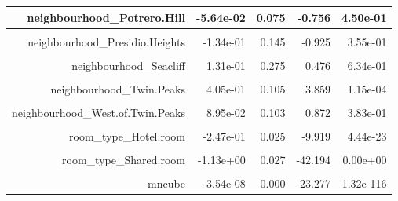 \documentclass[justified, 11pt]{scrartcl}\usepackage[]{graphicx}\usepackage[]{xcolor}
\newenvironment{knitrout}{}{} %
\begin{document}
\begin{knitrout}
\begin{table}
\begin{tabular}{r|r|r|r|r}
\hline
neighbourhood\_Potrero.Hill & -5.64e-02 & 0.075 & -0.756 & 4.50e-01\\
\hline
\cellcolor{gray!6}{neighbourhood\_Presidio} & \cellcolor{gray!6}{-1.45e-01} & \cellcolor{gray!6}{0.303} & \cellcolor{gray!6}{-0.477} & \cellcolor{gray!6}{6.33e-01}\\
\hline
neighbourhood\_Presidio.Heights & -1.34e-01 & 0.145 & -0.925 & 3.55e-01\\
\hline
\cellcolor{gray!6}{neighbourhood\_Russian.Hill} & \cellcolor{gray!6}{-2.91e-01} & \cellcolor{gray!6}{0.121} & \cellcolor{gray!6}{-2.411} & \cellcolor{gray!6}{1.59e-02}\\
\hline
neighbourhood\_Seacliff & 1.31e-01 & 0.275 & 0.476 & 6.34e-01\\
\hline
\cellcolor{gray!6}{neighbourhood\_South.of.Market} & \cellcolor{gray!6}{-2.59e-01} & \cellcolor{gray!6}{0.084} & \cellcolor{gray!6}{-3.068} & \cellcolor{gray!6}{2.16e-03}\\
\hline
neighbourhood\_Twin.Peaks & 4.05e-01 & 0.105 & 3.859 & 1.15e-04\\
\hline
\cellcolor{gray!6}{neighbourhood\_Visitacion.Valley} & \cellcolor{gray!6}{2.58e-02} & \cellcolor{gray!6}{0.087} & \cellcolor{gray!6}{0.295} & \cellcolor{gray!6}{7.68e-01}\\
\hline
neighbourhood\_West.of.Twin.Peaks & 8.95e-02 & 0.103 & 0.872 & 3.83e-01\\
\hline
\cellcolor{gray!6}{neighbourhood\_Western.Addition} & \cellcolor{gray!6}{-9.34e-02} & \cellcolor{gray!6}{0.098} & \cellcolor{gray!6}{-0.956} & \cellcolor{gray!6}{3.39e-01}\\
\hline
room\_type\_Hotel.room & -2.47e-01 & 0.025 & -9.919 & 4.44e-23\\
\hline
\cellcolor{gray!6}{room\_type\_Private.room} & \cellcolor{gray!6}{-5.86e-01} & \cellcolor{gray!6}{0.019} & \cellcolor{gray!6}{-30.317} & \cellcolor{gray!6}{8.36e-193}\\
\hline
room\_type\_Shared.room & -1.13e+00 & 0.027 & -42.194 & 0.00e+00\\
\hline
\cellcolor{gray!6}{mnsqd} & \cellcolor{gray!6}{5.29e-05} & \cellcolor{gray!6}{0.000} & \cellcolor{gray!6}{26.108} & \cellcolor{gray!6}{3.52e-145}\\
\hline
mncube & -3.54e-08 & 0.000 & -23.277 & 1.32e-116\\
\hline
\end{tabular}
\endgroup{}
\end{table}

\end{knitrout}
\normalsize

{}

\end{document}
